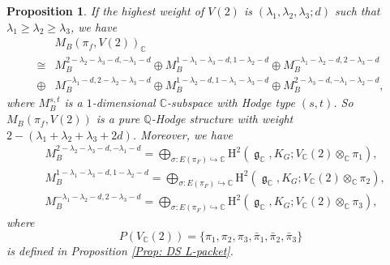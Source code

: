 \documentclass[11pt, a4paper]{amsart}
\theoremstyle{plain}
\newtheorem{proposition}[theorem]{Proposition}
\theoremstyle{definition}
\numberwithin{equation}{section}
\def\CC{\mathbb{C}}
\def\QQ{\mathbb{Q}}
\DeclareMathOperator{\lieg}{\mathfrak g}
\begin{document}
\begin{proposition}
\label{Prop: Hodge decomp for motives}
     If the highest weight of $V(2)$ is $(\lambda_1, \lambda_2, \lambda_3; d)$ such that $\lambda_1 \ge \lambda_2 \ge \lambda_3$, 
     we have 
     \begin{align*}
        & M_{B}({\pi}_f, V(2))_{\CC} \\
        \cong & M_{B}^{2-\lambda_2-\lambda_3 - d, -\lambda_1 - d} \oplus M_{B}^{1-\lambda_1 - \lambda_3 - d, 1 - \lambda_2 - d} \oplus M_{B}^{-\lambda_1 - \lambda_2 - d, 2 - \lambda_3 - d} \\
        \oplus & M_{B}^{-\lambda_1 - d, 2 - \lambda_2 - \lambda_3 - d} \oplus M_{B}^{1 - \lambda_2 -d, 1 - \lambda_1 - \lambda_3 - d} \oplus M_{B}^{2 - \lambda_3 - d, -\lambda_1 - \lambda_2 - d},  
    \end{align*}
    where $M_{B}^{s, t}$ is a $1$-dimensional $\CC$-subspace with Hodge type $(s, t)$. 
    So $M_{B}({\pi}_f, V(2))$ is a pure $\QQ$-Hodge structure with weight $2 - (\lambda_1 + \lambda_2 + \lambda_3 + 2d)$. 
    Moreover, we have 
    \begin{align*}
        & M_{B}^{2-\lambda_2-\lambda_3 - d, -\lambda_1 - d} = \bigoplus_{ \sigma: E(\pi_F) \hookrightarrow \CC } \mathrm{H}^{2}(\lieg_{\CC}, K_{G}; V_{\CC}(2) \otimes_{\CC} \pi_{1}), \\
        & M_{B}^{1-\lambda_1 - \lambda_3 - d, 1 - \lambda_2 - d} = \bigoplus_{\sigma: E(\pi_F) \hookrightarrow \CC } \mathrm{H}^{2}(\lieg_{\CC}, K_{G}; V_{\CC}(2) \otimes_{\CC} \pi_{2}), \\
        & M_{B}^{-\lambda_1 - \lambda_2 - d, 2 - \lambda_3 - d}  = \bigoplus_{\sigma: E(\pi_F) \hookrightarrow  \CC } \mathrm{H}^{2}(\lieg_{\CC}, K_{G}; V_{\CC}(2) \otimes_{\CC} \pi_{3}), 
    \end{align*}
    where 
    \begin{equation*}
        P(V_{\CC}(2)) = \{ \pi_1, \pi_2, \pi_3, \bar{\pi}_1, \bar{\pi}_2, \bar{\pi}_3 \}
    \end{equation*}
    is defined in Proposition \ref{Prop: DS L-packet}. 
\end{proposition}
\end{document}
